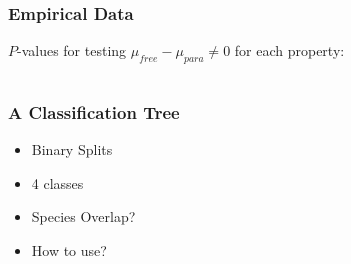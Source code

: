 \documentclass{beamer}
\begin{document}
\begin{frame}
\frametitle{Empirical Data }
$P$-values for testing $\mu_{free} - \mu_{para}\neq0$ for each property:\vspace{.25in}

\tiny{
\begin{tabular}{|r| c c c c c c|}
\hline

\hline
\end{tabular}}
\end{frame}

\begin{frame}
\frametitle{A Classification Tree}
\begin{itemize}[<+->]
\item Binary Splits
\item 4 classes
\item Species Overlap?
\item How to use?
\end{itemize}
\end{frame}
\end{document}
